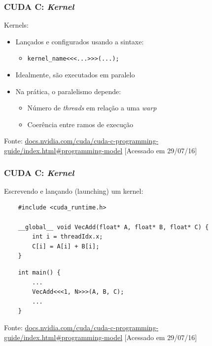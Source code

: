 \documentclass[10pt, compress]{beamer}
\begin{document}
\begin{frame}
    \frametitle{CUDA C: \textit{Kernel}}
    \alert{Kernels}:
    \begin{itemize}
        \item Lançados e configurados usando a sintaxe:
            \begin{itemize}
                \item \texttt{kernel\_name\alert{<<<}...\alert{>>>}(...);}
            \end{itemize}
            \pause
        \item Idealmente, são executados em \alert{paralelo}
            \pause
        \item Na prática, o paralelismo depende:
            \begin{itemize}
                \item Número de \textit{threads} em relação a uma \textit{warp}
                    \pause
                \item Coerência entre ramos de execução
            \end{itemize}
    \end{itemize}

    \vfill

    \begin{center}
        \tiny{Fonte: \url{docs.nvidia.com/cuda/cuda-c-programming-guide/index.html\#programming-model} [Acessado em 29/07/16]}
    \end{center}
\end{frame}

\begin{frame}[fragile]
    \frametitle{CUDA C: \textit{Kernel}}
    Escrevendo e \alert{lançando} (launching) um \alert{kernel}:
    \begin{lstlisting}
    #include <cuda_runtime.h>

    __global__ void VecAdd(float* A, float* B, float* C) {
        int i = threadIdx.x;
        C[i] = A[i] + B[i];
    }
    \end{lstlisting}
    \pause
    \begin{lstlisting}
    int main() {
        ...
        VecAdd<<<1, N>>>(A, B, C);
        ...
    }
    \end{lstlisting}
    \vfill

    \begin{center}
        \tiny{Fonte: \url{docs.nvidia.com/cuda/cuda-c-programming-guide/index.html\#programming-model} [Acessado em 29/07/16]}
    \end{center}
\end{frame}
\end{document}

